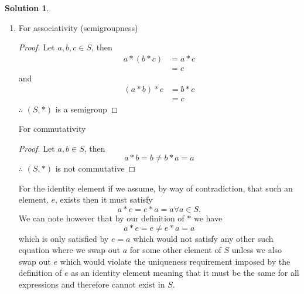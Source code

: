\documentclass[10pt]{article}
\theoremstyle{definition}
\newtheorem{soln}{Solution}
\newcommand{\justif}[2]{&{#1}&\text{#2}}
\begin{document}
\begin{soln}
\begin{enumerate}[label=(\alph*)]
\begin{proof}
\begin{align*}
              a*b & = \frac{ab}{a+b}                                                                         \\
                  & = \frac{ba}{b+a}\justif{\quad}{Commutativity of $+$ and $\cdot$ on $\mathbb{Q}^{\geq0}$} \\                                                                     \\
                  & = b*a \justif{\quad}{Definition of $*$ in reverse}
            \end{align*}
            $\therefore$ $(S, *)$ is commutative\qedhere
          \end{proof}
    \item For associativity (semigroupness)
          \begin{proof}
            Let $a,b,c\in S$, then
            \begin{align*}
              a*(b*c) & = a*c \\
                      & = c
            \end{align*}
            and
            \begin{align*}
              (a*b)*c & = b*c \\
                      & = c
            \end{align*}
            $\therefore$ $(S, *)$ is a semigroup\qedhere
          \end{proof}
          For commutativity
          \begin{proof}
            Let $a,b\in S$, then
            $$a*b=b\neq b*a=a$$
            $\therefore$ $(S, *)$ is not commutative\qedhere
          \end{proof}
          For the identity element if we assume, by way of contradiction, that such an
          element, $e$, exists then it must satisfy
          $$a*e=e*a=a\forall a\in S.$$
          We can note however that by our definition of $*$ we have
          $$a*e=e\neq e*a=a$$
          which is only satisfied by $e=a$ which would not satisfy any other such equation
          where we swap out $a$ for some other element of $S$ unless we also swap out $e$
          which would violate the uniqueness requirement imposed by the definition of $e$ as
          an identity element meaning that it must be the same for all expressions and therefore
          cannot exist in $S$.
  \end{enumerate}
\end{soln}
\end{document}
